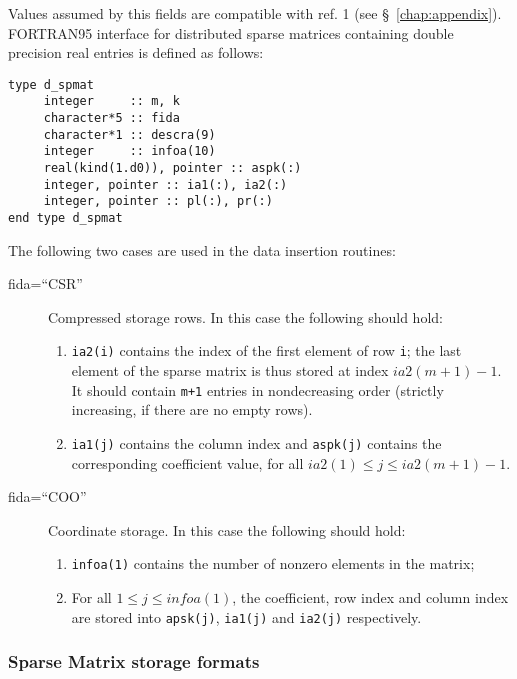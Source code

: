 Values assumed by this fields are compatible with ref. 1 (see \S~\ref{chap:appendix}).\\
FORTRAN95 interface for distributed sparse matrices containing double precision
real entries is defined as follows:
\begin{verbatim}
type d_spmat
     integer     :: m, k
     character*5 :: fida
     character*1 :: descra(9)
     integer     :: infoa(10)
     real(kind(1.d0)), pointer :: aspk(:)
     integer, pointer :: ia1(:), ia2(:)
     integer, pointer :: pl(:), pr(:)
end type d_spmat	
\end{verbatim}
The following two cases are used in the data insertion routines: 
\begin{description}
\item[fida=``CSR''] Compressed storage rows. In this case the
following should hold: 
\begin{enumerate}
\item \verb|ia2(i)| contains the index of the first element of row
\verb|i|; the last element of the sparse matrix is thus stored at
index $ia2(m+1)-1$. It should contain \verb|m+1| entries in
nondecreasing order (strictly increasing, if there are no empty rows).
\item \verb|ia1(j)| contains the column index and \verb|aspk(j)|
contains the corresponding coefficient value, for all $ia2(1) \le j
\le ia2(m+1)-1$.
\end{enumerate}
\item[fida=``COO''] Coordinate storage. In this case the following
should hold: 
\begin{enumerate}
\item \verb|infoa(1)| contains the number of nonzero elements in the
matrix; 
\item For all $1 \le j \le infoa(1)$, the coefficient, row index and
column index are stored into \verb|apsk(j)|, \verb|ia1(j)| and
\verb|ia2(j)| respectively. 
\end{enumerate}
\end{description}


\subsubsection{Sparse Matrix storage formats}

